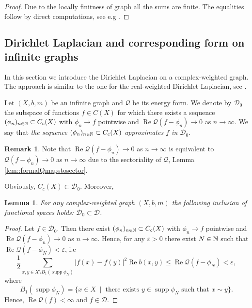 \documentclass[a4paper,11pt]{amsart}
\newtheorem{lemma}[theorem]{Lemma}
\theoremstyle{definition}
\newtheorem{remark}[theorem]{Remark}
\DeclareMathOperator\supp{supp}
\renewcommand{\Re}{\operatorname{Re}}%
\newcommand{\D}{\mathcal{D}}
\newcommand{\Q}{\mathcal{Q}}
\begin{document}
\begin{proof}
Due to the locally finitness of graph all the sums are finite. The equalities follow by direct computations, see e.g \cite[Lemma 7]{Muranova1}. 
\end{proof}



\subsection{Dirichlet Laplacian and corresponding form on infinite graphs}\label{section::DirichletLaplacian}

 In this section we introduce the Dirichlet Laplacian on a  complex-weighted graph. The approach is similar to the one for  the real-weighted Dirichlet Laplacian, see \cite{KellerLenzWojcBook}.  
 
 Let $(X,b,m)$ be an infinite graph and $\mathcal Q$ be its energy form. We denote by $\D_0$  the subspace of functions $f\in C(X)$ for which
there exists a sequence $(\phi_n)_{n\in \Bbb N}\subset C_c(X)$ with $\phi_n\to f$ pointwise and $\Re \mathcal Q(f-\phi_n)\to 0$ as $n\to \infty$. We say that {\em the  sequence $(\phi_n)_{n\in \Bbb N}\subset C_c(X)$ approximates $f$ in $\D_0$}.


\begin{remark}\label{rem::d0ReQ}
Note that $\Re\mathcal Q(f-\phi_n)\to 0$ as $n\to \infty$ is equivalent to $\mathcal Q(f-\phi_n)\to 0$ as $n\to \infty$ due to the sectoriality of $\Q$,  Lemma \ref{lem::formalQmapstosector}.
\end{remark}

Obviously, $C_c(X)\subset \D_0$. Moreover,

\begin{lemma}
For any complex-weighted graph $(X,b,m)$ the following inclusion of functional spaces holds: $\D_0 \subset \D$.
\end{lemma}

\begin{proof}
Let $f\in\D_0$. Then there exist $(\phi_n)_{n\in \Bbb N}\subset C_c(X)$ with $\phi_n\to f$ pointwise and $\Re \mathcal Q(f-\phi_n)\to 0$ as $n\to \infty$. Hence, for any $\varepsilon>0$ there exist $N\in \Bbb N$ such that $\Re \mathcal Q(f-\phi_N)<\varepsilon$, i.e
$$
\dfrac12\sum_{x,y\in X\setminus B_1(\supp \phi_N)}|f(x)-f(y)|^2\Re b(x,y)\le \Re \mathcal Q(f-\phi_N)<\varepsilon,
$$
where
$$
 B_1(\supp \phi_N)=\{x\in X\;\mid\; \mbox{there exists }y\in \supp \phi_N \mbox{ such that }x\sim y\}.
$$
Hence, $\Re \mathcal Q(f)<\infty$ and $f\in\D$.
\end{proof}
\end{document}
